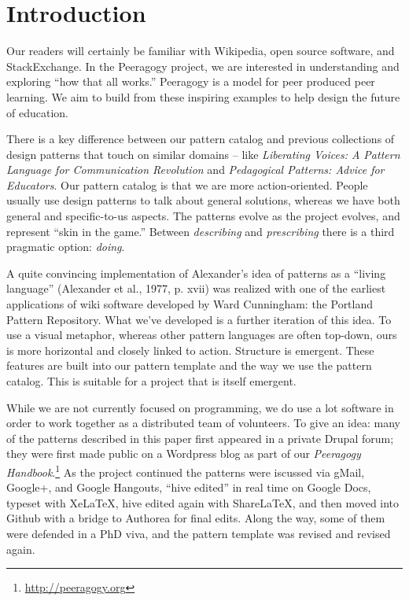 \section{Introduction}

Our readers will certainly be familiar with Wikipedia, open source software, and StackExchange.  In the Peeragogy project, we are interested in understanding and exploring ``how that all works.''   Peeragogy is a model for peer produced peer learning.  We aim to build from these inspiring examples to help design the future of education. 

There is a key difference between our pattern catalog and previous collections of design patterns that touch on similar domains -- like \emph{Liberating Voices: A Pattern Language for Communication Revolution} and \emph{Pedagogical Patterns: Advice for Educators}.  Our pattern catalog is that we are more action-oriented.  People usually use design patterns to talk about general solutions, whereas we have both general and specific-to-us aspects. The patterns evolve as the project evolves, and represent ``skin in the game.''   Between \emph{describing} and \emph{prescribing} there is a third pragmatic option: \emph{doing}.  

A quite convincing implementation of Alexander’s idea of patterns as a “living language” (Alexander et
al., 1977, p. xvii) was realized with one of the earliest applications of wiki
software developed by Ward Cunningham: the Portland Pattern Repository.
What we've developed is a further iteration of this idea. To use a visual metaphor, whereas other pattern languages are often top-down, ours is more horizontal and closely linked to action.  Structure is emergent.  These features are built into our pattern template and the way we use the pattern catalog.  This is suitable for a project
that is itself emergent.

While we are not currently focused on programming, we do use a lot software in order to work together as a distributed team of volunteers.  To give an idea: many of the patterns described in this paper first appeared in a private Drupal forum; they were first made public on a Wordpress blog as part of our \emph{Peeragogy Handbook}.\footnote{\url{http://peeragogy.org}}  As the project continued the patterns were iscussed via gMail, Google+, and Google Hangouts, ``hive edited'' in real time on Google Docs, typeset with XeLaTeX, hive edited again with ShareLaTeX, and then moved into Github with a bridge to Authorea for final edits. Along the way, some of them were defended in a PhD viva, and the pattern template was revised and revised again. 

